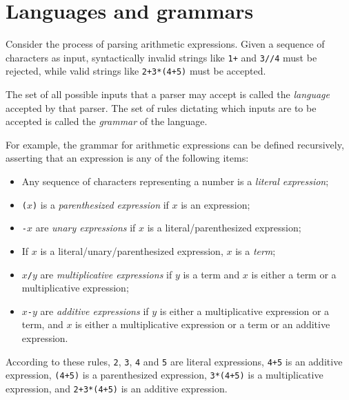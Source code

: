 \documentclass[UdineBachThesis,american,11pt]{PhdThesis}
\begin{document}
  \section{Languages and grammars}

  Consider the process of parsing arithmetic expressions. Given a sequence of
  characters as input, syntactically invalid strings like \mbox{\texttt{1+}} and
  \mbox{\texttt{3//4}} must be rejected, while valid strings like
  \mbox{\texttt{2+3*(4+5)}} must be accepted.

  The set of all possible inputs that a parser may accept is called the
  \emph{language} accepted by that parser. The set of rules dictating which
  inputs are to be accepted is called the \emph{grammar} of the language.

  For example, the grammar for arithmetic expressions can be defined
  recursively, asserting that an expression is any of the following items:

  \begin{itemize}
    \item Any sequence of characters representing a number is a \emph{literal
    expression};

    \item \mbox{\texttt{($x$)}} is a \emph{parenthesized expression} if $x$ is
    an expression;

    \item \mbox{\texttt{-$x$}} are \emph{unary expressions} if $x$ is a
    literal/parenthesized expression;

    \item If $x$ is a literal/unary/parenthesized expression, $x$ is a
    \emph{term};

    \item \mbox{\texttt{$x$/$y$}} are \emph{multiplicative expressions} if $y$
    is a term and $x$ is either a term or a multiplicative expression;

    \item \mbox{\texttt{$x$-$y$}} are \emph{additive expressions} if $y$ is
    either a multiplicative expression or a term, and $x$ is either a
    multiplicative expression or a term or an additive expression.
  \end{itemize}

  According to these rules, \texttt{2}, \texttt{3}, \texttt{4} and \texttt{5}
  are literal expressions, \mbox{\texttt{4+5}} is an additive expression,
  \mbox{\texttt{(4+5)}} is a parenthesized expression, \mbox{\texttt{3*(4+5)}}
  is a multiplicative expression, and \mbox{\texttt{2+3*(4+5)}} is an additive
  expression.
\end{document}
